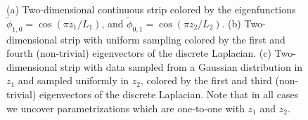 \begin{figure}[t]
\begin{subfigure}{0.3\textwidth}
\caption{}
\label{subfig:strip_evecs_nonuniform}
\end{subfigure}
%
\caption[Eigenfunctions of the Laplace-Beltrami operator on a two-dimensional strip]{(a) Two-dimensional continuous strip colored by the eigenfunctions $\tilde{\phi}_{1, 0} = \cos \left( {\pi z_1}/{L_1} \right)$, and $\tilde{\phi}_{0, 1} = \cos \left( {\pi z_2}/{L_2} \right)$. (b) Two-dimensional strip with uniform sampling colored by the first and fourth (non-trivial) eigenvectors of the discrete Laplacian. (c) Two-dimensional strip with data sampled from a Gaussian distribution in $z_1$ and sampled uniformly in $z_2$, colored by the first and third (non-trivial) eigenvectors of the discrete Laplacian. Note that in all cases we uncover parametrizations which are one-to-one with $z_1$ and $z_2$.}
\end{figure}

